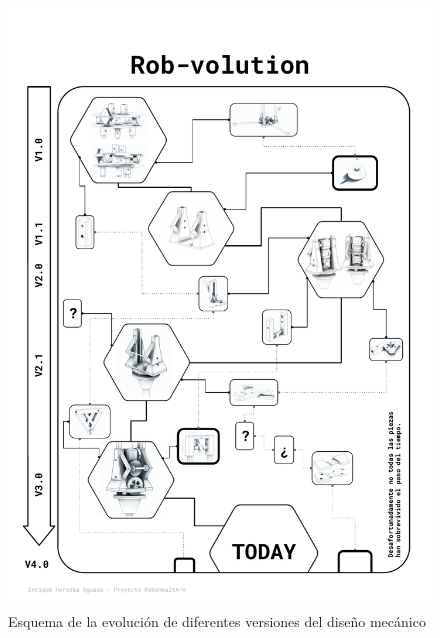 \begin{figure}
    \vspace{-1cm}
    \begin{adjustwidth}{-1.9cm}{-1.5cm}
       \centering
       \includegraphics[width=1.1\textwidth]{figuras/Imagenes_PuntoPartida/Rob-volution.pdf}
       \caption{Esquema de la evolución de diferentes versiones del diseño mecánico}
       \label{fig:PuntoPartida:rovbolution}
   \end{adjustwidth}
\end{figure}

%

